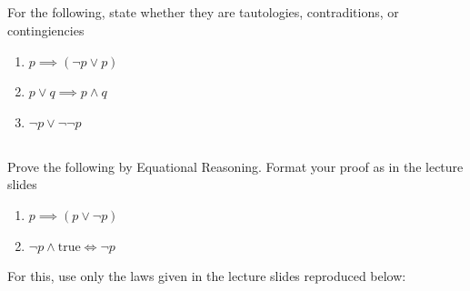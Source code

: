 \documentclass[twocolumn]{article}
\begin{document}
\subsection{}

For the following, state whether they are tautologies, contraditions, or contingiencies

\begin{enumerate}
    \item $p \implies (\neg p \vee p)$
    \item $p \vee q \implies p \wedge q$
    \item $\neg p \vee \neg\neg p$
\end{enumerate}

\subsection{}

Prove the following by Equational Reasoning. Format your proof as in the lecture slides

\begin{enumerate}
    \item $p \implies (p \vee \neg p)$
    \item $\neg p \wedge \text{true} \Longleftrightarrow \neg p$
\end{enumerate}

For this, use only the laws given in the lecture slides reproduced below:
\end{document}
